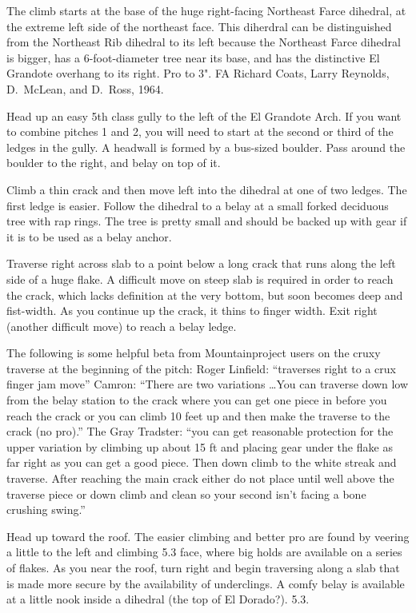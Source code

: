 \documentclass{tahquitz}
\begin{document}
The climb starts at the base of the huge right-facing Northeast Farce dihedral,
at the extreme left side of the northeast face.
This diherdral can be distinguished from the Northeast Rib dihedral to its left
because the Northeast Farce dihedral is bigger, has a 6-foot-diameter tree near its base,
and has the distinctive El Grandote overhang to its right.
Pro to 3". FA Richard Coats, Larry Reynolds, D.~McLean, and D.~Ross, 1964.

\somespace

 Head up an easy 5th class gully to the left of the El Grandote Arch.
If you want to combine pitches 1 and 2, you will need to start at the second or third
of the ledges in the gully. A headwall is formed by a bus-sized boulder. Pass around the boulder
to the right, and belay on top of it.

 Climb a thin crack and then move left into the dihedral at one of two ledges.
The first ledge is easier. Follow the dihedral to a belay at a small forked deciduous tree with rap
rings. The tree is pretty small and should be backed up with gear if it is to be
used as a belay anchor.

 Traverse right across slab to a point below a long crack that runs
along the left side of a huge flake. A difficult move on steep slab is required in
order to reach the crack, which lacks definition at the very bottom, but soon becomes
deep and fist-width. As you continue up the crack, it thins to finger width.
Exit right (another difficult move) to reach a belay ledge.

The following is some helpful beta from Mountainproject users on the
cruxy traverse at the beginning of the pitch: Roger Linfield: ``traverses right to a
crux finger jam move''  Camron: ``There are two variations
\ldots You can traverse down low from the belay station to the crack
where you can get one piece in before you reach the crack or you can
climb 10 feet up and then make the traverse to the crack (no pro).''
The Gray Tradster: ``you can get reasonable protection for the upper variation
by climbing up about 15 ft and placing gear under the flake as far
right as you can get a good piece. Then down climb to the white streak
and traverse.  After reaching the main crack either do not place until
well above the traverse piece or down climb and clean so your second
isn't facing a bone crushing swing.''


 Head up toward the roof. The easier climbing and better pro are found
by veering a little to the left and climbing 5.3 face, where big holds are available on a series of flakes.
As you near the roof, turn right and begin traversing
along a slab that is made more secure by the availability of underclings. A comfy
belay is available at a little nook inside a dihedral (the top of El Dorado?). 5.3.
\end{document}
